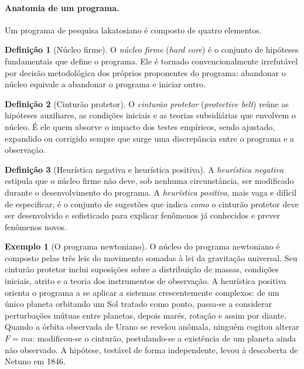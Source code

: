 \documentclass[9pt,a4paper]{extarticle}
\newcommand{\ntc}[1]{\textcolor{notice}{#1}}
\theoremstyle{definition}
\newtheorem{definition}{Definição}[section]
\newtheorem{example}{Exemplo}[section]
\begin{document}
\paragraph{Anatomia de um programa.}
Um programa de pesquisa lakatosiano é composto de quatro elementos.

\begin{definition}[Núcleo firme]
O \emph{núcleo firme} (\emph{hard core}) é o conjunto de hipóteses fundamentais que define o programa. Ele é tornado \ntc{convencionalmente irrefutável} por decisão metodológica dos próprios proponentes do programa: abandonar o núcleo equivale a abandonar o programa e iniciar outro.
\end{definition}

\begin{definition}[Cinturão protetor]
O \emph{cinturão protetor} (\emph{protective belt}) reúne as hipóteses auxiliares, as condições iniciais e as teorias subsidiárias que envolvem o núcleo. É ele quem \ntc{absorve} o impacto dos testes empíricos, sendo ajustado, expandido ou corrigido sempre que surge uma discrepância entre o programa e a observação.
\end{definition}

\begin{definition}[Heurística negativa e heurística positiva]
A \emph{heurística negativa} estipula que o núcleo firme não deve, sob nenhuma circunstância, ser modificado durante o desenvolvimento do programa. A \emph{heurística positiva}, mais vaga e difícil de especificar, é o conjunto de sugestões que indica \emph{como} o cinturão protetor deve ser desenvolvido e sofisticado para explicar fenômenos já conhecidos e prever fenômenos novos.
\end{definition}

\begin{example}[O programa newtoniano]
O núcleo do programa newtoniano é composto pelas três leis do movimento somadas à lei da gravitação universal. Seu cinturão protetor inclui suposições sobre a distribuição de massas, condições iniciais, atrito e a teoria dos instrumentos de observação. A heurística positiva orienta o programa a se aplicar a sistemas crescentemente complexos: de um único planeta orbitando um Sol tratado como ponto, passa-se a considerar perturbações mútuas entre planetas, depois marés, rotação e assim por diante. Quando a órbita observada de Urano se revelou anômala, ninguém cogitou alterar $F=ma$: modificou-se o cinturão, postulando-se a existência de um planeta ainda não observado. A hipótese, testável de forma independente, levou à descoberta de Netuno em 1846.
\end{example}
\end{document}
